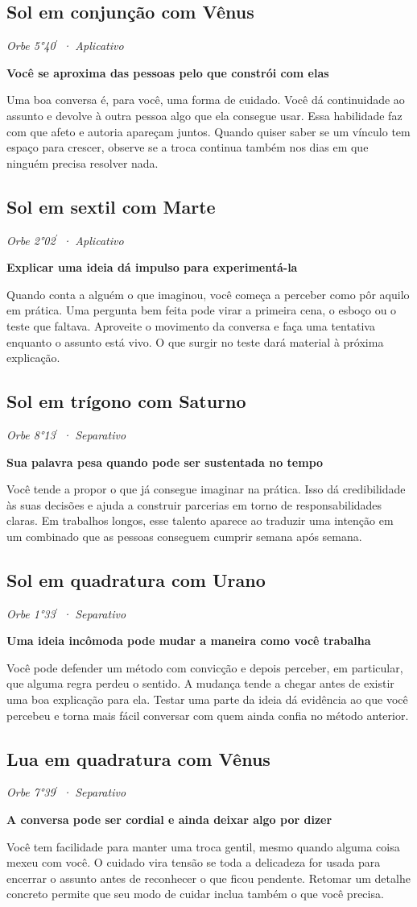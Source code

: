 \documentclass[11pt,a4paper]{article}
\newcommand{\leitura}[3]{\subsection{#1}\textit{#2}\par #3}
\newcommand{\subtituloleitura}[1]{\textbf{#1}\par\nopagebreak[4]}
\begin{document}
\leitura{Sol em conjunção com Vênus}{Orbe 5°40\ensuremath{^{\prime}} · Aplicativo}{
\label{aspecto:sol-venus}\subtituloleitura{Você se aproxima das pessoas pelo que constrói com elas}
Uma boa conversa é, para você, uma forma de cuidado. Você dá continuidade ao assunto e devolve à outra pessoa algo que ela consegue usar. Essa habilidade faz com que afeto e autoria apareçam juntos. Quando quiser saber se um vínculo tem espaço para crescer, observe se a troca continua também nos dias em que ninguém precisa resolver nada.
}

\leitura{Sol em sextil com Marte}{Orbe 2°02\ensuremath{^{\prime}} · Aplicativo}{
\label{aspecto:sol-marte}\subtituloleitura{Explicar uma ideia dá impulso para experimentá-la}
Quando conta a alguém o que imaginou, você começa a perceber como pôr aquilo em prática. Uma pergunta bem feita pode virar a primeira cena, o esboço ou o teste que faltava. Aproveite o movimento da conversa e faça uma tentativa enquanto o assunto está vivo. O que surgir no teste dará material à próxima explicação.
}

\leitura{Sol em trígono com Saturno}{Orbe 8°13\ensuremath{^{\prime}} · Separativo}{
\subtituloleitura{Sua palavra pesa quando pode ser sustentada no tempo}
Você tende a propor o que já consegue imaginar na prática. Isso dá credibilidade às suas decisões e ajuda a construir parcerias em torno de responsabilidades claras. Em trabalhos longos, esse talento aparece ao traduzir uma intenção em um combinado que as pessoas conseguem cumprir semana após semana.
}

\leitura{Sol em quadratura com Urano}{Orbe 1°33\ensuremath{^{\prime}} · Separativo}{
\subtituloleitura{Uma ideia incômoda pode mudar a maneira como você trabalha}
Você pode defender um método com convicção e depois perceber, em particular, que alguma regra perdeu o sentido. A mudança tende a chegar antes de existir uma boa explicação para ela. Testar uma parte da ideia dá evidência ao que você percebeu e torna mais fácil conversar com quem ainda confia no método anterior.
}

\leitura{Lua em quadratura com Vênus}{Orbe 7°39\ensuremath{^{\prime}} · Separativo}{
\label{aspecto:lua-venus}\subtituloleitura{A conversa pode ser cordial e ainda deixar algo por dizer}
Você tem facilidade para manter uma troca gentil, mesmo quando alguma coisa mexeu com você. O cuidado vira tensão se toda a delicadeza for usada para encerrar o assunto antes de reconhecer o que ficou pendente. Retomar um detalhe concreto permite que seu modo de cuidar inclua também o que você precisa.
}
\end{document}
